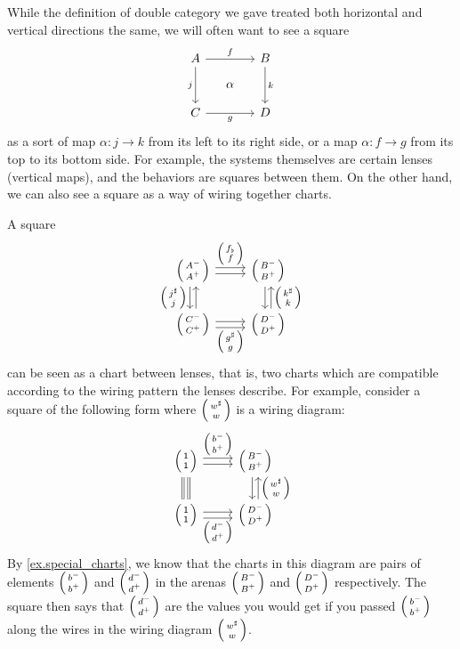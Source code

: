 \documentclass[DynamicalBook]{subfiles}
\begin{document}
\begin{remark}\label{rmk.double_category_direction}
While the definition of double category we gave treated both horizontal and
vertical directions the same, we will often want to see a square
\[
  \begin{tikzcd}[sep=small]
    A \ar[dd, "j"'] \ar[rr, "f"] & & B \ar[dd, "k"] \\
    & \alpha & \\
    C \ar[rr, "g"'] & & D
  \end{tikzcd}
\]
as a sort of map $\alpha : j \to k$ from its left to its right side, or a map
$\alpha : f \to g$ from its top to its bottom side. For example, the systems
themselves are certain lenses (vertical maps), and the behaviors are squares
between them. On the other hand, we can also see a square as a way of wiring
together charts. 
\end{remark}

\begin{example}\label{ex.understanding_squares_in_double_cat_of_arenas}
  A square
  \begin{equation}\label{eqn.understanding_squares_in_double_cat_of_arenas}
    \begin{tikzcd}
      \lens{A^-}{A^+} \ar[r, shift left, "\lens{f_{\flat}}{f}"] \ar[r, shift
      right] \ar[d, shift right, "\lens{j^{\sharp}}{j}"'] \ar[d, shift left,
      leftarrow] & \lens{B^-}{B^+} \ar[d, shift left, leftarrow,
      "\lens{k^{\sharp}}{k}"] \ar[d, shift right]\\
      \lens{C^-}{C^+} \ar[r, shift right, "\lens{g^{\sharp}}{g}"'] \ar[r, shift
      left] & \lens{D^-}{D^+}
    \end{tikzcd}
    \end{equation}
  can be seen as a chart between lenses, that is, two charts which are
  compatible according to the wiring pattern the lenses describe. For example, consider a square of the
  following form where $\lens{w^{\sharp}}{w}$ is a wiring diagram:
  \[
    \begin{tikzcd}
      \lens{\ord{1}}{\ord{1}} \ar[r, shift left, "\lens{b^-}{b^+}"] \ar[r, shift
      right] \ar[d, shift right, equals] \ar[d, shift left, equals] &
      \lens{B^-}{B^+} \ar[d, shift left, leftarrow,
      "\lens{w^{\sharp}}{w}"] \ar[d, shift right]\\
      \lens{\ord{1}}{\ord{1}} \ar[r, shift right, "\lens{d^-}{d^+}"'] \ar[r,
      shift left] & \lens{D^-}{D^+}
    \end{tikzcd}
  \]
  By \cref{ex.special_charts}, we know that the charts in this diagram are pairs
  of elements $\lens{b^-}{b^+}$ and $\lens{d^-}{d^+}$ in the arenas
  $\lens{B^-}{B^+}$ and $\lens{D^-}{D^+}$ respectively. The square then says
  that $\lens{d^-}{d^+}$ are the values you would get if you passed
  $\lens{b^-}{b^+}$ along the wires in the wiring diagram
  $\lens{w^{\sharp}}{w}$.
\end{example}
\end{document}
